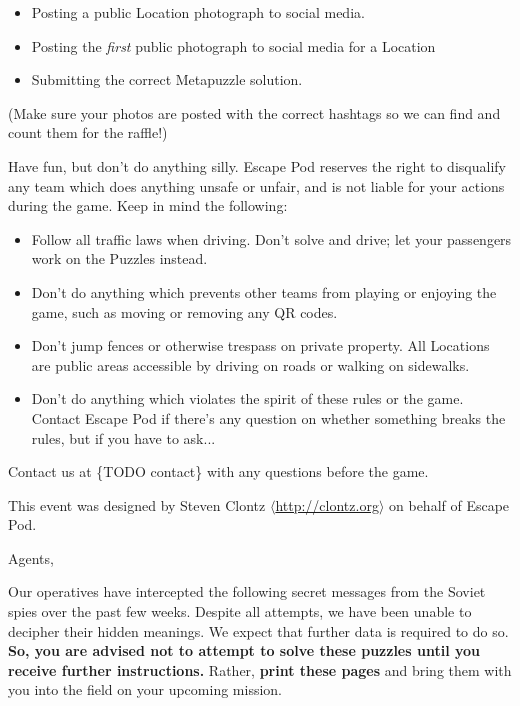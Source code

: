 \documentclass{puzzlehunt}
\begin{document}
\begin{itemize}
  \item Posting a public Location photograph to social media.
  \item Posting the \textit{first} public photograph to social media for a Location
  \item Submitting the correct Metapuzzle solution.
\end{itemize}

(Make sure your photos are posted with the correct hashtags so we can find
and count them for the raffle!)


Have fun, but don't do anything silly. Escape Pod reserves the right to
disqualify any team which does anything unsafe or unfair, and is not liable
for your actions during the game. Keep in mind the following:

\begin{itemize}
  \item Follow all traffic laws when driving. Don't solve and drive; let your
    passengers work on the Puzzles instead.
  \item Don't do anything which prevents other teams from playing or enjoying
    the game, such as moving or removing any QR codes.
  \item Don't jump fences or otherwise trespass on private property. All
    Locations are public areas accessible by driving on roads or walking on
    sidewalks.
  \item Don't do anything which violates the spirit of these rules or the game.
    Contact Escape Pod if there's any question on whether something breaks
    the rules, but if you have to ask...
\end{itemize}


Contact us at \{TODO contact\} with any questions before the game.

\vfill

{\footnotesize This event was designed by Steven Clontz
\(\langle\)\url{http://clontz.org}\(\rangle\) on behalf of Escape Pod.}



\noindent Agents,

Our operatives have intercepted the following secret messages from the
Soviet spies over the past few weeks. Despite all attempts, we have been
unable to decipher their hidden meanings. We expect that further data
is required to do so.
\textbf{So, you are advised not to attempt to solve these puzzles until you
receive further instructions.} Rather, \textbf{print these pages} and
bring them with you into the field on your upcoming mission.
\end{document}
